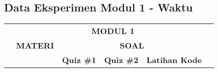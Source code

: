 \begin{landscape}
  \chapter{Data Eksperimen Modul 1 - Waktu} \label{appendix:data-modul1-waktu}
  \scriptsize
  \begin{longtable}[c]{|l|llllllll|}
    \hline
    \rowcolor[HTML]{C0C0C0}
    \multicolumn{1}{|c|}{\cellcolor[HTML]{C0C0C0}}                                  & \multicolumn{8}{c|}{\cellcolor[HTML]{C0C0C0}\textbf{MODUL 1}}                                                                                                                                                                                                                                                                                                                                                                                                                                                                                                                                                                                         \\ \cline{2-9}
    \rowcolor[HTML]{C0C0C0}
    \multicolumn{1}{|c|}{\cellcolor[HTML]{C0C0C0}}                                  & \multicolumn{4}{c|}{\cellcolor[HTML]{C0C0C0}\textbf{MATERI}}                        & \multicolumn{3}{c|}{\cellcolor[HTML]{C0C0C0}\textbf{SOAL}}                          & \multicolumn{1}{c|}{\cellcolor[HTML]{C0C0C0}}                                                                                                                                                                                                                                                                                                                                                                                                                             \\ \cline{2-8}
    \rowcolor[HTML]{C0C0C0}
    \multicolumn{1}{|c|}{\cellcolor[HTML]{C0C0C0}}                                  & \multicolumn{1}{c|}{\cellcolor[HTML]{C0C0C0}}                                       & \multicolumn{1}{c|}{\cellcolor[HTML]{C0C0C0}}                                       & \multicolumn{1}{c|}{\cellcolor[HTML]{C0C0C0}}                                       & \multicolumn{1}{c|}{\cellcolor[HTML]{C0C0C0}}                                       & \multicolumn{1}{c|}{\cellcolor[HTML]{C0C0C0}\textbf{Quiz \#1}} & \multicolumn{1}{c|}{\cellcolor[HTML]{C0C0C0}\textbf{Quiz \#2}} & \multicolumn{1}{c|}{\cellcolor[HTML]{C0C0C0}\textbf{Latihan Kode}} & \multicolumn{1}{c|}{\cellcolor[HTML]{C0C0C0}}                                          \\ \cline{6-8}

\end{longtable}
\end{landscape}
